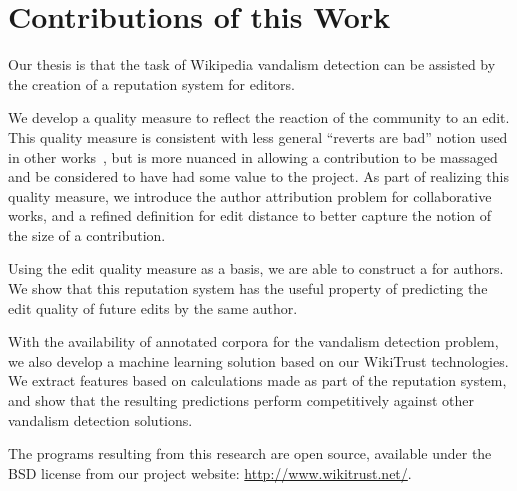 \section{Contributions of this Work}

Our thesis is that the task of Wikipedia vandalism detection
can be assisted by the creation of a reputation system
for editors.

We develop a quality measure to reflect the reaction of
the community to an edit.
This quality measure is consistent with less general
``reverts are bad'' notion used in other
works~\cite{Smets2008,Itakura2009,Belani2010,West2010},
but is more nuanced in allowing a contribution to be massaged
and be considered to have had some value to the project.
As part of realizing this quality measure, we introduce the
author attribution problem for collaborative works,
and a refined definition for edit distance to better capture
the notion of the size of a contribution.

Using the edit quality measure as a basis, we are able
to construct a  for authors.
We show that this reputation system has the useful property
of predicting the edit quality of future edits by the same
author.

With the availability of annotated corpora for the vandalism
detection problem, we also develop a machine learning solution based on our
WikiTrust technologies.
We extract features based on calculations made as part of the
reputation system, and show that the resulting predictions perform
competitively against other vandalism detection solutions.

The programs resulting from this research are open source,
available under the BSD license from our project website:
\url{http://www.wikitrust.net/}.

